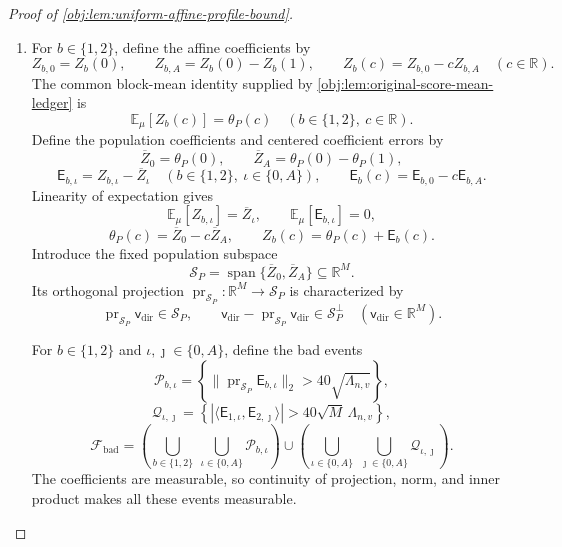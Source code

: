 \documentclass[11pt]{article}
\begin{document}
\begin{proof}[Proof of \cref{obj:lem:uniform-affine-profile-bound}]
\begin{enumerate}
\item
For \(b\in\{1,2\}\), define the affine coefficients by
\[
Z_{b,0}=Z_b(0),
\qquad
Z_{b,A}=Z_b(0)-Z_b(1),
\qquad
Z_b(c)=Z_{b,0}-cZ_{b,A}
\quad(c\in\mathbb R).
\]
The common block-mean identity supplied by \cref{obj:lem:original-score-mean-ledger} is
\[
\mathbb E_\mu[Z_b(c)]=\theta_P(c)
\quad(b\in\{1,2\},\ c\in\mathbb R).
\]
Define the population coefficients and centered coefficient errors by
\[
\overline Z_0=\theta_P(0),
\qquad
\overline Z_A=\theta_P(0)-\theta_P(1),
\]
\[
\mathsf E_{b,\iota}=Z_{b,\iota}-\overline Z_\iota
\quad(b\in\{1,2\},\ \iota\in\{0,A\}),
\qquad
\mathsf E_b(c)=\mathsf E_{b,0}-c\mathsf E_{b,A}.
\]
Linearity of expectation gives
\[
\mathbb E_\mu[Z_{b,\iota}]=\overline Z_\iota,
\qquad
\mathbb E_\mu[\mathsf E_{b,\iota}]=0,
\]
\[
\theta_P(c)=\overline Z_0-c\overline Z_A,
\qquad
Z_b(c)=\theta_P(c)+\mathsf E_b(c).
\]
Introduce the fixed population subspace
\[
\mathcal S_P=\operatorname{span}\{\overline Z_0,\overline Z_A\}
\subseteq\mathbb R^M.
\]
Its orthogonal projection \(\operatorname{pr}_{\mathcal S_P}:\mathbb R^M\to\mathcal S_P\) is characterized by
\[
\operatorname{pr}_{\mathcal S_P}\mathsf v_{\mathrm{dir}}\in\mathcal S_P,
\qquad
\mathsf v_{\mathrm{dir}}-\operatorname{pr}_{\mathcal S_P}\mathsf v_{\mathrm{dir}}\in\mathcal S_P^\perp
\quad(\mathsf v_{\mathrm{dir}}\in\mathbb R^M).
\]

For \(b\in\{1,2\}\) and \(\iota,\jmath\in\{0,A\}\), define the bad events
\[
\mathcal P_{b,\iota}
=
\left\{
\|\operatorname{pr}_{\mathcal S_P}\mathsf E_{b,\iota}\|_2
>
40\sqrt{\Lambda_{n,v}}
\right\},
\]
\[
\mathcal Q_{\iota,\jmath}
=
\left\{
|\langle\mathsf E_{1,\iota},\mathsf E_{2,\jmath}\rangle|
>
40\sqrt M\,\Lambda_{n,v}
\right\},
\]
\[
\mathcal F_{\mathrm{bad}}
=
\left(
\bigcup_{b\in\{1,2\}}\ \bigcup_{\iota\in\{0,A\}}
\mathcal P_{b,\iota}
\right)
\cup
\left(
\bigcup_{\iota\in\{0,A\}}\ \bigcup_{\jmath\in\{0,A\}}
\mathcal Q_{\iota,\jmath}
\right).
\]
The coefficients are measurable, so continuity of projection, norm, and inner product makes all these events measurable.


\end{enumerate}
\end{proof}
\end{document}
